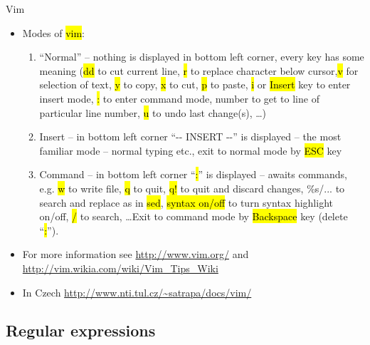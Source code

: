 \documentclass[compress, ucs, xelatex, 11pt, xcolor=svgnames,
  hyperref={
    bookmarks=true,
    unicode=true,
    colorlinks=true,
    pdftitle={Linux, command line and MetaCentrum},
    plainpages=false,
    pdfauthor={Vojtech Zeisek},
    pdfsubject={Course about use of Linux command line, writing shell scripts and using MetaCentrum of CESNET},
    pdfcreator={XeLaTeX},
    pdfkeywords={Linux, GNU, BASH, shell, command line, MetaCentrum},
    linkcolor=Red,
    anchorcolor=Blue,
    citecolor=Purple,
    filecolor=DodgerBlue,
    menucolor=DarkOrchid,
    urlcolor=DeepSkyBlue,
    pdftex},
  url={hyphens, lowtilde} %
  ]{beamer}
\renewcommand{\texttt}[1]{\hl{\ttfamily #1}}
\begin{document}
\begin{frame}{Vim}
\begin{itemize}
 \item Modes of \texttt{vim}:
  \begin{enumerate}
   \item ``Normal'' -- nothing is displayed in bottom left corner, every key has some meaning (\texttt{dd} to cut current line, \texttt{r} to replace character below cursor,\texttt{v} for selection of text, \texttt{y} to copy, \texttt{x} to cut, \texttt{p} to paste, \texttt{i} or \texttt{Insert} key to enter insert mode, \texttt{:} to enter command mode, number to get to line of particular line number, \texttt{u} to undo last change(s), \ldots)
   \item Insert -- in bottom left corner ``-{-} INSERT {-}-'' is displayed -- the most familiar mode -- normal typing etc., exit to normal mode by \texttt{ESC} key
   \item Command -- in bottom left corner ``\texttt{:}'' is displayed -- awaits commands, e.g. \texttt{w} to write file, \texttt{q} to quit, \texttt{q!} to quit and discard changes, \%s/... to search and replace as in \texttt{sed}, \texttt{syntax on/off} to turn syntax highlight on/off, \texttt{/} to search, \ldots Exit to command mode by \texttt{Backspace} key (delete ``\texttt{:}'').
  \end{enumerate}
  \item For more information see \url{http://www.vim.org/} and \url{http://vim.wikia.com/wiki/Vim_Tips_Wiki}
  \item In Czech \url{http://www.nti.tul.cz/~satrapa/docs/vim/}
\end{itemize}
\end{frame}

\subsection{Regular expressions}
\end{document}
